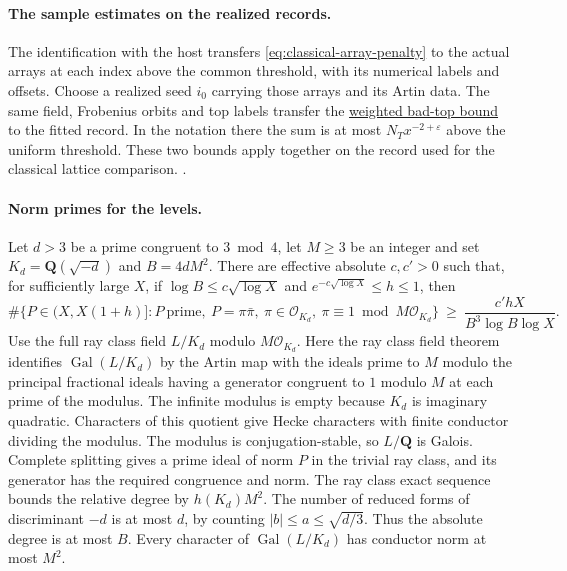 \paragraph{The sample estimates on the realized records.}
%
The identification with the host transfers
\eqref{eq:classical-array-penalty} to the actual arrays at each index
above the common threshold, with its numerical labels and offsets.
Choose a realized seed \(i_0\) carrying those arrays and its Artin
data. The same field, Frobenius orbits and top labels transfer
the \hyperlink{proof.classical-top-sample}{weighted bad-top bound}
to the fitted record. In the notation there the sum is at most
\(N_Tx^{-2+\varepsilon}\) above the uniform threshold. These two
bounds apply together on the record used for the classical lattice
comparison.
.

\paragraph{Norm primes for the levels.}
%
Let \(d>3\) be a prime congruent to \(3\bmod 4\), let \(M\ge3\) be
an integer and set \(K_d=\mathbf Q(\sqrt{-d})\) and \(B=4dM^2\).
There are effective absolute \(c,c'>0\) such that, for sufficiently
large \(X\), if \(\log B\le c\sqrt{\log X}\) and
\(e^{-c\sqrt{\log X}}\le h\le1\), then
\begin{equation}
\label{eq:selection-short-norm-primes}
 \#\{P\in(X,X(1+h)]: P\ \text{prime},\ P=\pi\bar\pi,\
          \pi\in\mathcal O_{K_d},\ \pi\equiv1\bmod M\mathcal O_{K_d}\}
 \ \ge\ \frac{c'hX}{B^3\log B\log X} .
\end{equation}
Use the full ray class field \(L/K_d\) modulo \(M\mathcal O_{K_d}\).
Here the ray class field theorem identifies
\(\operatorname{Gal}(L/K_d)\) by the Artin map with the ideals
prime to \(M\) modulo the principal fractional ideals having
a generator congruent to \(1\) modulo \(M\) at each prime of
the modulus. The infinite modulus is empty because \(K_d\)
is imaginary quadratic. Characters of this quotient give
Hecke characters with finite conductor dividing the modulus.
\cite[Ch.~V, Theorem~3.6, p.~158]{f1milne-cft}
The modulus is conjugation-stable, so \(L/\mathbf Q\) is Galois.
Complete splitting gives a prime ideal of norm \(P\) in the trivial
ray class, and its generator has the required congruence and norm.
The ray class exact sequence bounds the relative degree by
\(h(K_d)M^2\). The number of reduced forms of discriminant \(-d\) is
at most \(d\), by counting \(|b|\le a\le\sqrt{d/3}\). Thus the
absolute degree is at most \(B\). Every character of
\(\operatorname{Gal}(L/K_d)\) has conductor norm at most \(M^2\).
\cite[Ch.~V, Theorem~3.6]{f1milne-cft}

